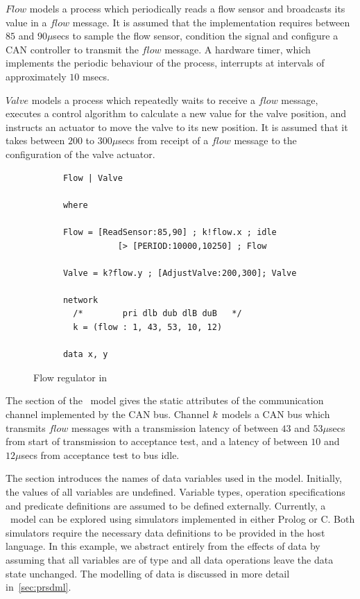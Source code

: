 $Flow$ models a process which periodically reads a flow sensor and
broadcasts its value in a $flow$ message.  It is assumed that the
implementation requires between $85$ and $90\mu$secs to sample the
flow sensor, condition the signal and configure a CAN controller to
transmit the $flow$ message. A hardware timer, which implements the
periodic behaviour of the process, interrupts at intervals of
approximately $10$ msecs.

$Valve$ models a process which repeatedly waits to receive a $flow$ message,  
executes a control algorithm to calculate a new value for the valve
position, and instructs an actuator to move the valve to its new position.
It is assumed that it takes between $200$ to $300\mu$secs from receipt
of a $flow$ message to the configuration of the valve actuator.
\begin{figure}
\small
\begin{verbatim}
      Flow | Valve

      where

      Flow = [ReadSensor:85,90] ; k!flow.x ; idle 
                 [> [PERIOD:10000,10250] ; Flow

      Valve = k?flow.y ; [AdjustValve:200,300]; Valve

      network
        /*        pri dlb dub dlB duB   */
        k = (flow : 1, 43, 53, 10, 12)

      data x, y
\end{verbatim}
\caption{Flow regulator in \bcandle \label{fig:bcflowexample}}
\end{figure}

The  section of the \bcandle\ model gives the static
attributes of the communication channel implemented by the CAN bus.
Channel ${k}$ models a CAN bus which transmits $flow$ messages with 
a transmission latency of between $43$ and $53\mu$secs from start of 
transmission to acceptance test, and a latency of between $10$ and
$12\mu$secs from acceptance test to bus idle.

The  section introduces the names of data variables used in
the model. Initially, the values of all variables are undefined.
Variable types, operation specifications and predicate definitions are
assumed to be defined externally.  Currently, a \bcandle\ model can be
explored using simulators implemented in either Prolog or C.  Both
simulators require the necessary data definitions to be provided in
the host language. In this example, we abstract entirely from the
effects of data by assuming that all variables are of type 
and all data operations leave the data state unchanged. The modelling
of data is discussed in more detail in~\Sec\ref{sec:prsdml}.

